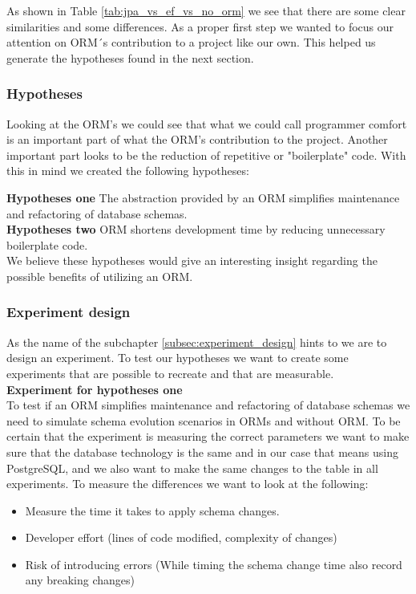 As shown in Table \ref{tab:jpa_vs_ef_vs_no_orm} we see that there are some clear similarities and some differences. 
As a proper first step we wanted to focus our attention on ORM´s contribution to a project like our own.
This helped us generate the hypotheses found in the next section.

\subsubsection{Hypotheses}
Looking at the ORM's we could see that what we could call programmer comfort is an important part of what the ORM's contribution to the project. 
Another important part looks to be the reduction of repetitive or "boilerplate" code.
With this in mind we created the following hypotheses:

\textbf{Hypotheses one} \newline
The abstraction provided by an ORM simplifies maintenance and refactoring of database schemas. \\

\textbf{Hypotheses two} \newline
ORM shortens development time by reducing unnecessary boilerplate code. \\

We believe these hypotheses would give an interesting insight regarding the possible benefits of utilizing an ORM.

\subsubsection{Experiment design}
As the name of the subchapter \ref{subsec:experiment_design} hints to we are to design an experiment. 
To test our hypotheses we want to create some experiments that are possible to recreate and that are measurable. \\

\textbf{Experiment for hypotheses one} \\
To test if an ORM simplifies maintenance and refactoring of database schemas we need to simulate schema evolution scenarios in ORMs and without ORM.
To be certain that the experiment is measuring the correct parameters we want to make sure that the database technology is the same and in our case that means using PostgreSQL, and we also want to make the same changes to the table in all experiments.
To measure the differences we want to look at the following: 
\begin{itemize}
    \item Measure the time it takes to apply schema changes.
    \item Developer effort (lines of code modified, complexity of changes)
    \item Risk of introducing errors (While timing the schema change time also record any breaking changes)
\end{itemize}


